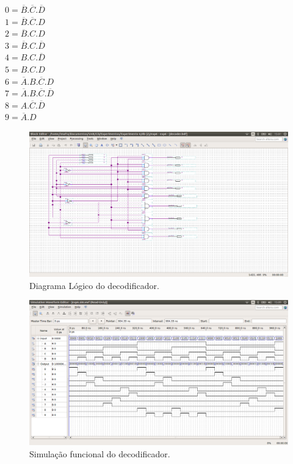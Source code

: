 \documentclass[12pt]{article}
\begin{document}
\begin{center}
	$0 = \overline{B}.\overline{C}.\overline{D}$\\
	$1 = \overline{B}.\overline{C}.D$\\
	$2 = \overline{B}.C.D$\\
	$3 = \overline{B}.C.\overline{D}$\\
	$4 = B.C.\overline{D}$\\
	$5 = B.C.D$\\
	$6 = \overline{A}.B.\overline{C}.D$\\
	$7 = \overline{A}.B.\overline{C}.\overline{D}$\\
	$8 = A.\overline{C}.\overline{D}$\\
	$9 = \overline{A}.D$\\
\end{center}



\begin{figure}[H]
	\centering
	\includegraphics[width=1\textwidth]{decoder.png}
	\caption{Diagrama Lógico do decodificador.}
	\label{fig:decoder}
\end{figure}

\begin{figure}[H]
	\centering
	\includegraphics[width=1\textwidth]{functionaldecoder.png}
	\caption{Simulação funcional do decodificador.}
	\label{fig:funcdecoder}
\end{figure}
\end{document}
